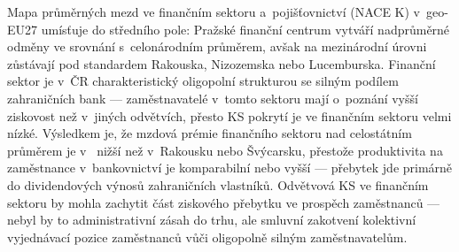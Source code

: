 Mapa průměrných mezd ve finančním sektoru a~pojišťovnictví (\ac{NACE} K) v~\acs{geo-EU27} umísťuje  do středního pole: Pražské finanční centrum vytváří nadprůměrné odměny ve srovnání s~celonárodním průměrem, avšak na mezinárodní úrovni zůstávají pod standardem Rakouska, Nizozemska nebo Lucemburska.
Finanční sektor je v~ČR charakteristický oligopolní strukturou se silným podílem zahraničních bank --- zaměstnavatelé v~tomto sektoru mají o~poznání vyšší ziskovost než v~jiných odvětvích, přesto \ac{KS} pokrytí je ve finančním sektoru velmi nízké.
Výsledkem je, že mzdová prémie finančního sektoru nad celostátním průměrem je v~ nižší než v~Rakousku nebo Švýcarsku, přestože produktivita na zaměstnance v~bankovnictví je komparabilní nebo vyšší --- přebytek jde primárně do dividendových výnosů zahraničních vlastníků.
Odvětvová \ac{KS} ve finančním sektoru by mohla zachytit část ziskového přebytku ve prospěch zaměstnanců --- nebyl by to administrativní zásah do trhu, ale smluvní zakotvení kolektivní vyjednávací pozice zaměstnanců vůči oligopolně silným zaměstnavatelům.


